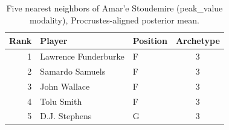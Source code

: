 \begin{table}[htbp]
  \centering\small
  \begin{tabular}{rllc}
    \toprule
    Rank & Player & Position & Archetype \\
    \midrule
    1 & Lawrence Funderburke & F & 3 \\
    2 & Samardo Samuels & F & 3 \\
    3 & John Wallace & F & 3 \\
    4 & Tolu Smith & F & 3 \\
    5 & D.J. Stephens & G & 3 \\
    \bottomrule
  \end{tabular}
  \caption{Five nearest neighbors of Amar'e Stoudemire (peak_value modality), Procrustes-aligned posterior mean.}
  \label{tab:Amar_e_Stoudemire_neighbors_peak_value}
\end{table}

